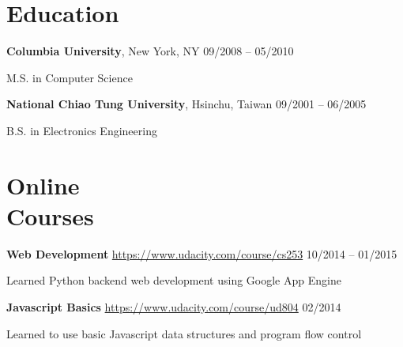 \documentclass[margin,line]{resume}
\begin{document}
\begin{resume}
    \section{\myheadingstyle Education}

    \textbf{Columbia University}, New York, NY \hfill 09/2008 -- 05/2010 \vspace{-3mm}\\\vspace{-1mm}%
      \begin{list2}
       \item M.S. in Computer Science
      \end{list2}
    \vspace{-1mm}
 
    \textbf{National Chiao Tung University}, Hsinchu, Taiwan \hfill 09/2001 -- 06/2005 \vspace{-3mm}\\\vspace{-1mm}%
      \begin{list2}
       \item B.S. in Electronics Engineering
      \end{list2}
    \vspace{-1mm}

    \section{\myheadingstyle Online \\ Courses}

    \textbf{Web Development} \url{https://www.udacity.com/course/cs253} \hfill 10/2014 -- 01/2015 \vspace{-3mm}\\\vspace{-1mm}%
      \begin{list2}
       \item Learned Python backend web development using Google App Engine
      \end{list2}
    \vspace{-2mm}

    \textbf{Javascript Basics} \url{https://www.udacity.com/course/ud804} \hfill 02/2014 \vspace{-3mm}\\\vspace{-1mm}%
      \begin{list2}
       \item Learned to use basic Javascript data structures and program flow control
      \end{list2}
    \vspace{-2mm}


\end{resume}
\end{document}
